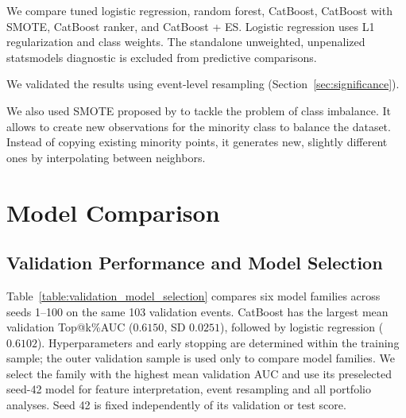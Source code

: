 \documentclass{ieeeaccess}
\begin{document}
\textcolor{revisionblue}{We compare tuned logistic regression, random forest, CatBoost, CatBoost with SMOTE, CatBoost ranker, and CatBoost + ES. Logistic regression uses L1 regularization and class weights. The standalone unweighted, unpenalized statsmodels diagnostic is excluded from predictive comparisons.}

\textcolor{revisionblue}{We validated the results using event-level resampling (Section~\ref{sec:significance}).}

We also used SMOTE proposed by \cite{chawla2002smote} to tackle the problem of class imbalance. It allows to create new observations for the minority class to balance the dataset. Instead of copying existing minority points, it generates new, slightly different ones by interpolating between neighbors.


\FloatBarrier %
\section{\textcolor{revisionblue}{Model Comparison}}
\label{section:results}

\subsection{Validation Performance and Model Selection}
\textcolor{revisionblue}{Table~\ref{table:validation_model_selection} compares six model families across seeds 1--100 on the same 103 validation events. CatBoost has the largest mean validation Top@k\%AUC ($0.6150$, SD $0.0251$), followed by logistic regression ($0.6102$). Hyperparameters and early stopping are determined within the training sample; the outer validation sample is used only to compare model families. We select the family with the highest mean validation AUC and use its preselected seed-42 model for feature interpretation, event resampling and all portfolio analyses. Seed 42 is fixed independently of its validation or test score.}
\end{document}
